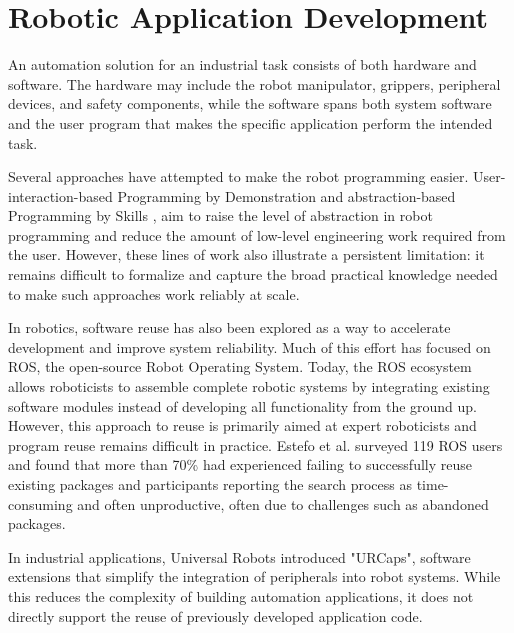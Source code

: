 \section{Robotic Application Development}
An automation solution for an industrial task consists of both hardware and software. The hardware may include the robot manipulator, grippers, peripheral devices, and safety components, while the software spans both system software and the user program that makes the specific application perform the intended task.

Several approaches have attempted to make the robot programming easier. User-interaction-based Programming by Demonstration \cite{ravichandar2020recent} and abstraction-based Programming by Skills \cite{saukkoriipi2020programming}, aim to raise the level of abstraction in robot programming and reduce the amount of low-level engineering work required from the user. However, these lines of work also illustrate a persistent limitation: it remains difficult to formalize and capture the broad practical knowledge needed to make such approaches work reliably at scale.

In robotics, software reuse has also been explored as a way to accelerate development and improve system reliability. Much of this effort has focused on ROS, the open-source Robot Operating System. \cite{quigley2009ros} Today, the ROS ecosystem allows roboticists to assemble complete robotic systems by integrating existing software modules instead of developing all functionality from the ground up. \cite{kolak2020takes} However, this approach to reuse is primarily aimed at expert roboticists and program reuse remains difficult in practice. Estefo et al. surveyed 119 ROS users and found that more than 70\% had experienced failing to successfully reuse existing packages and participants reporting the search process as time-consuming and often unproductive, often due to challenges such as abandoned packages. \cite{estefo2019robot}

In industrial applications, Universal Robots introduced "URCaps", software extensions that simplify the integration of peripherals into robot systems. While this reduces the complexity of building automation applications, it does not directly support the reuse of previously developed application code.

